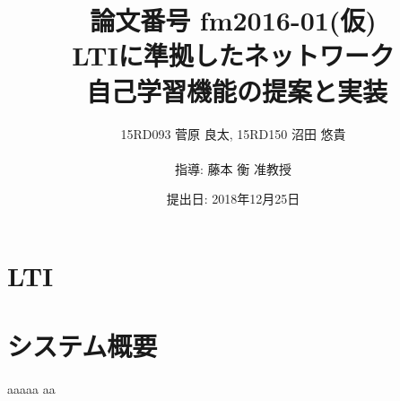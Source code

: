 \documentclass[11pt, a4paper]{jarticle}
\title{\LARGE 論文番号 fm2016-01(仮)\\ \Huge LTIに準拠したネットワーク\\自己学習機能の提案と実装}
\author{15RD093 菅原 良太, 15RD150 沼田 悠貴\\ \\指導: 藤本 衡 准教授}
\date{提出日: 2018年12月25日}
\begin{document}
\pagestyle{normal}
\maketitle
\thispagestyle{normal}
\clearpage


\fontsize{11pt}{28pt}\selectfont


\clearpage

\tableofcontents
\clearpage


\clearpage


\clearpage

\section{LTI}




\clearpage

\section{システム概要}



\clearpage


\clearpage



\clearpages

\begin{thebibliography}{99}
   aaaaa
   aa
\end{thebibliography}
\end{document}
